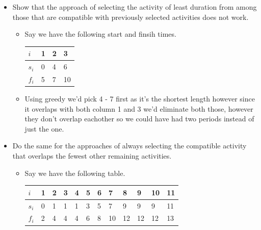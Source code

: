 \documentclass{article}
\begin{document}
\begin{enumerate}
    \begin{itemize}
      \item Show that the approach of selecting the activity of least duration from among those that are compatible with previously selected activities does not work.
      \begin{itemize}
        \item Say we have the following start and finsih times.
          \begin{table}[H]
            \centering
            \begin{tabular}{|l|lll}
            \hline
            $i$   & \multicolumn{1}{l|}{1} & \multicolumn{1}{l|}{2} & \multicolumn{1}{l|}{3} \\ \hline
            $s_i$ & 0                      & 4                      & 6                      \\ \cline{1-1}
            $f_i$ & 5                      & 7                      & 10                     \\ \cline{1-1}
            \end{tabular}
          \end{table}
        \item Using greedy we'd pick 4 - 7 first as it's the shortest length however since it overlaps with both column 1 and 3 we'd eliminate both those, however they don't overlap eachother so we could have had two periods instead of just the one.
      \end{itemize}
      \item Do the same for the approaches of always selecting the compatible activity that overlaps the fewest other remaining activities.
      \begin{itemize}
        \item Say we have the following table.
        
        \begin{table}[H]
          \centering
          \begin{tabular}{|l|lllllllllll}
          \hline
          $i$   & \multicolumn{1}{l|}{1} & \multicolumn{1}{l|}{2} & \multicolumn{1}{l|}{3} & \multicolumn{1}{l|}{4} & \multicolumn{1}{l|}{5} & \multicolumn{1}{l|}{6} & \multicolumn{1}{l|}{7} & \multicolumn{1}{l|}{8} & \multicolumn{1}{l|}{9} & \multicolumn{1}{l|}{10} & \multicolumn{1}{l|}{11} \\ \hline
          $s_i$ & 0                      & 1                      & 1                      & 1                      & 3                      & 5                      & 7                      & 9                      & 9                      & 9                       & 11                      \\ \cline{1-1}
          $f_i$ & 2                      & 4                      & 4                      & 4                      & 6                      & 8                      & 10                     & 12                     & 12                     & 12                      & 13                      \\ \cline{1-1}
          \end{tabular}
        \end{table}


\end{itemize}
\end{itemize}
\end{enumerate}
\end{document}
